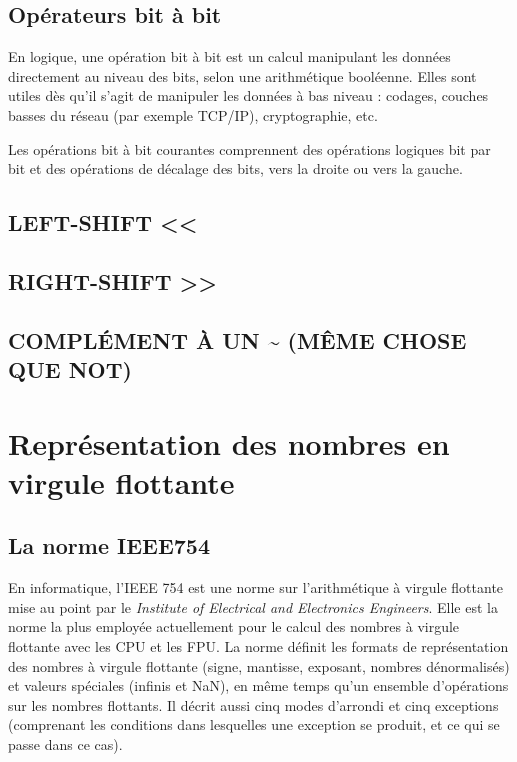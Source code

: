 \documentclass[
  letterpaper,
]{scrbook}
\theoremstyle{plain}
\theoremstyle{definition}
\theoremstyle{definition}
\theoremstyle{remark}
\begin{document}
\hypertarget{opuxe9rateurs-bit-uxe0-bit}{%
\subsection{Opérateurs bit à bit}\label{opuxe9rateurs-bit-uxe0-bit}}

En logique, une opération bit à bit est un calcul manipulant les données
directement au niveau des bits, selon une arithmétique booléenne. Elles
sont utiles dès qu'il s'agit de manipuler les données à bas niveau :
codages, couches basses du réseau (par exemple TCP/IP), cryptographie,
etc.

Les opérations bit à bit courantes comprennent des opérations logiques
bit par bit et des opérations de décalage des bits, vers la droite ou
vers la gauche.

\hypertarget{left-shift}{%
\subsection{LEFT-SHIFT \textless\textless{}}\label{left-shift}}

\hypertarget{right-shift}{%
\subsection{RIGHT-SHIFT \textgreater\textgreater{}}\label{right-shift}}

\hypertarget{compluxe9ment-uxe0-un-muxeame-chose-que-not}{%
\subsection{COMPLÉMENT À UN \textasciitilde{} (MÊME CHOSE QUE
NOT)}\label{compluxe9ment-uxe0-un-muxeame-chose-que-not}}

\hypertarget{repruxe9sentation-des-nombres-en-virgule-flottante}{%
\section{Représentation des nombres en virgule
flottante}\label{repruxe9sentation-des-nombres-en-virgule-flottante}}

\hypertarget{la-norme-ieee754}{%
\subsection{La norme IEEE754}\label{la-norme-ieee754}}

En informatique, l'IEEE 754 est une norme sur l'arithmétique à virgule
flottante mise au point par le \emph{Institute of Electrical and
Electronics Engineers}. Elle est la norme la plus employée actuellement
pour le calcul des nombres à virgule flottante avec les CPU et les FPU.
La norme définit les formats de représentation des nombres à virgule
flottante (signe, mantisse, exposant, nombres dénormalisés) et valeurs
spéciales (infinis et NaN), en même temps qu'un ensemble d'opérations
sur les nombres flottants. Il décrit aussi cinq modes d'arrondi et cinq
exceptions (comprenant les conditions dans lesquelles une exception se
produit, et ce qui se passe dans ce cas).
\end{document}
